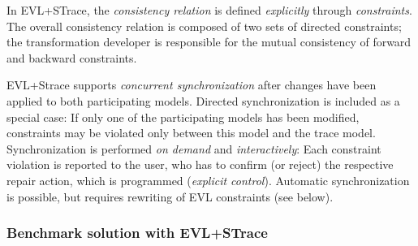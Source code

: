 In EVL+STrace, the \emph{consistency relation} is defined \emph{explicitly} through \emph{constraints}. The overall consistency relation is composed of two sets of directed constraints; the transformation developer is responsible for the mutual consistency of forward and backward constraints. 

EVL+Strace supports \emph{concurrent synchronization} after changes have been applied to both participating models. Directed synchronization is included as a special case: If only one of the participating models has been modified, constraints may be violated only between this model and the trace model. Synchronization is performed \emph{on demand} and \emph{interactively}: Each constraint violation is reported to the user, who has to confirm (or reject) the respective repair action, which is programmed (\emph{explicit control}). Automatic synchronization is possible, but requires rewriting of EVL constraints (see below).

  



\subsubsection{Benchmark solution with EVL+STrace}
\label{sec:solutionEVL}

%
%


